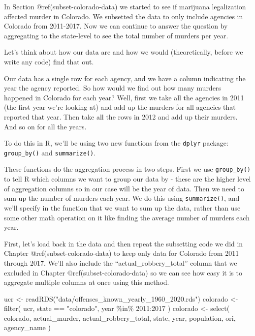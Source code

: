 \documentclass[
  a4paper,
]{krantz}
\makeatletter
\newenvironment{Shaded}{\begin{snugshade}}{\end{snugshade}}
\newcommand{\DecValTok}[1]{\textcolor[rgb]{0.00,0.00,0.81}{#1}}
\newcommand{\FunctionTok}[1]{\textcolor[rgb]{0.00,0.00,0.00}{#1}}
\newcommand{\NormalTok}[1]{#1}
\newcommand{\OtherTok}[1]{\textcolor[rgb]{0.56,0.35,0.01}{#1}}
\newcommand{\SpecialCharTok}[1]{\textcolor[rgb]{0.00,0.00,0.00}{#1}}
\newcommand{\StringTok}[1]{\textcolor[rgb]{0.31,0.60,0.02}{#1}}
\newenvironment{kframe}{%
\medskip{}
\setlength{\fboxsep}{.8em}
 \def\at@end@of@kframe{}%
 \ifinner\ifhmode%
  \def\at@end@of@kframe{\end{minipage}}%
  \begin{minipage}{\columnwidth}%
 \fi\fi%
 \def\FrameCommand##1{\hskip\@totalleftmargin \hskip-\fboxsep
 \colorbox{shadecolor}{##1}\hskip-\fboxsep
     \hskip-\linewidth \hskip-\@totalleftmargin \hskip\columnwidth}%
 \MakeFramed {\advance\hsize-\width
   \@totalleftmargin\z@ \linewidth\hsize
   \@setminipage}}%
 {\par\unskip\endMakeFramed%
 \at@end@of@kframe}
\renewenvironment{Shaded}{\begin{kframe}}{\end{kframe}}
\makeatother
\begin{document}
In Section @ref(subset-colorado-data) we started to see if
marijuana legalization affected murder in Colorado. We
subsetted the data to only include agencies in Colorado from
2011-2017. Now we can continue to answer the question by
aggregating to the state-level to see the total number of
murders per year.

Let's think about how our data are and how we would
(theoretically, before we write any code) find that out.

Our data has a single row for each agency, and we have a
column indicating the year the agency reported. So how would
we find out how many murders happened in Colorado for each
year? Well, first we take all the agencies in 2011 (the
first year we're looking at) and add up the murders for all
agencies that reported that year. Then take all the rows in
2012 and add up their murders. And so on for all the years.

To do this in R, we'll be using two new functions from the
\texttt{dplyr} package: \texttt{group\_by()} and
\texttt{summarize()}.

These functions do the aggregation process in two steps.
First we use \texttt{group\_by()} to tell R which columns we
want to group our data by - these are the higher level of
aggregation columns so in our case will be the year of data.
Then we need to sum up the number of murders each year. We
do this using \texttt{summarize()}, and we'll specify in the
function that we want to sum up the data, rather than use
some other math operation on it like finding the average
number of murders each year.

First, let's load back in the data and then repeat the
subsetting code we did in Chapter @ref(subset-colorado-data)
to keep only data for Colorado from 2011 through 2017. We'll
also include the ``actual\_robbery\_total'' column that we
excluded in Chapter @ref(subset-colorado-data) so we can see
how easy it is to aggregate multiple columns at once using
this method.

\begin{Shaded}
\begin{Highlighting}[]
\NormalTok{ucr }\OtherTok{\textless{}{-}} \FunctionTok{readRDS}\NormalTok{(}\StringTok{"data/offenses\_known\_yearly\_1960\_2020.rds"}\NormalTok{)}
\NormalTok{colorado }\OtherTok{\textless{}{-}} \FunctionTok{filter}\NormalTok{(}
\NormalTok{  ucr, state }\SpecialCharTok{==} \StringTok{"colorado"}\NormalTok{,}
\NormalTok{  year }\SpecialCharTok{\%in\%} \DecValTok{2011}\SpecialCharTok{:}\DecValTok{2017}
\NormalTok{)}
\NormalTok{colorado }\OtherTok{\textless{}{-}} \FunctionTok{select}\NormalTok{(}
\NormalTok{  colorado, actual\_murder, actual\_robbery\_total,}
\NormalTok{  state, year, population, ori, agency\_name}
\NormalTok{)}
\end{Highlighting}
\end{Shaded}
\end{document}
